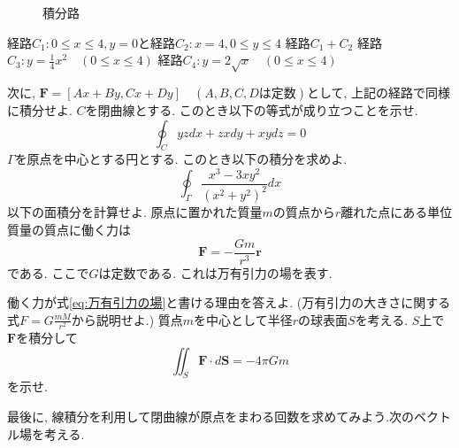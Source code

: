 \documentclass[a4j,dvipdfmx]{jsarticle}
\begin{document}
\begin{qparts}
\begin{figure}[h]
                \caption{積分路}\label{積分路}
            \end{figure}
            \begin{qlist}
                \qitem 経路$C_1:0\leq x\leq 4,y=0$と経路$C_2:x=4,0\leq y\leq 4$
                \qitem 経路$C_1+C_2$
                \qitem 経路$C_3:\displaystyle y=\frac{1}{4}x^2\quad (0\leq x\leq 4)$
                \qitem 経路$C_4:\displaystyle y=2\sqrt{x} \quad (0\leq x\leq 4)$
            \end{qlist}
            次に, $\bm{F}=[Ax+By,Cx+Dy]\quad(A,B,C,D\text{は定数})$として, 上記の経路で同様に積分せよ.
        \qpart $C$を閉曲線とする. このとき以下の等式が成り立つことを示せ.
            \begin{equation*}
                \oint_C yzdx+zxdy+xydz = 0
            \end{equation*}
        \qpart $\Gamma$を原点を中心とする円とする. このとき以下の積分を求めよ.
            \begin{equation*}
                \oint_\Gamma \frac{x^3-3xy^2}{(x^2+y^2)^2}dx
            \end{equation*}
        \qpart 以下の面積分を計算せよ.
        \qpart 原点に置かれた質量$m$の質点から$r$離れた点にある単位質量の質点に働く力は
            \begin{equation}
                \bm{F}=-\frac{Gm}{r^3}\bm{r} \label{eq:万有引力の場}        
            \end{equation}
            である. ここで$G$は定数である. これは万有引力の場を表す.
            \begin{qlist}
                \qitem 働く力が式\eqref{eq:万有引力の場}と書ける理由を答えよ. (万有引力の大きさに関する式$F=G\frac{mM}{r^2}$から説明せよ.)
                \qitem 質点$m$を中心として半径$r$の球表面$S$を考える. $S$上で$\bm{F}$を積分して
                    \begin{equation*}
                        \iint_S \bm{F}\cdot d\bm{S} = -4\pi Gm
                    \end{equation*}
                    を示せ.
            \end{qlist}
        \qpart 最後に, 線積分を利用して閉曲線が原点をまわる回数を求めてみよう.次のベクトル場を考える.
            \begin{equation*}

\end{equation*}
\end{qparts}
\end{document}
